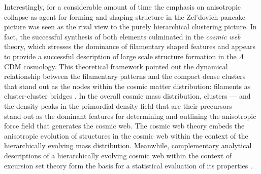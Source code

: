 Interestingly, for a considerable amount of time the emphasis on anisotropic collapse as agent for forming and shaping structure in 
the Zel'dovich pancake picture was seen as the rival view to the purely hierarchical clustering picture. In fact, the successful 
synthesis of both elements culminated in the \emph{cosmic web} theory, which stresses the dominance of filamentary 
shaped features and appears to provide a successful description of large scale structure formation in the $\Lambda$CDM cosmology. This theoretical 
framework pointed out the dynamical relationship between the filamentary patterns and the compact dense clusters that stand out 
as the nodes within the cosmic matter distribution: filaments as cluster-cluster bridges \citep[also see][]{Bond1996,Colberg2005,
Weygaert2009}. In the overall cosmic mass distribution, clusters --- and the density peaks in the primordial density field that are their 
precursors --- stand out as the dominant features for determining and outlining the anisotropic force field that generates the cosmic web. 
The cosmic web theory embeds the anisotropic evolution of structures in the cosmic web within the context of the hierarchically evolving 
mass distribution. Meanwhile, complementary analytical descriptions of a hierarchically evolving cosmic web within the 
context of excursion set theory form the basis for a statistical evaluation of its properties \citep{Sheth2003b,Shen2006}.


